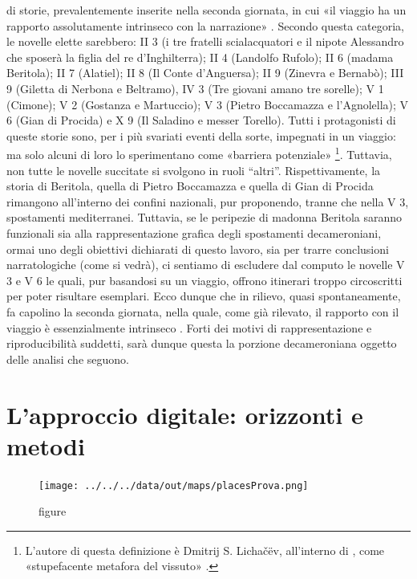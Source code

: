 di storie, prevalentemente inserite nella seconda giornata, in cui «il
viaggio ha un rapporto assolutamente intrinseco con la narrazione»
\autocite[p.~549]{asor1992}. Secondo questa categoria, le novelle elette
sarebbero: II 3 (i tre fratelli scialacquatori e il nipote Alessandro
che sposerà la figlia del re d'Inghilterra); II 4 (Landolfo Rufolo); II
6 (madama Beritola); II 7 (Alatiel); II 8 (Il Conte d'Anguersa); II 9
(Zinevra e Bernabò); III 9 (Giletta di Nerbona e Beltramo), IV 3 (Tre
giovani amano tre sorelle); V 1 (Cimone); V 2 (Gostanza e Martuccio); V
3 (Pietro Boccamazza e l'Agnolella); V 6 (Gian di Procida) e X 9 (Il
Saladino e messer Torello). Tutti i protagonisti di queste storie sono,
per i più svariati eventi della sorte, impegnati in un viaggio: ma solo
alcuni di loro lo sperimentano come «barriera potenziale» \footnote{L'autore
  di questa definizione è Dmitrij S. Lichačëv, all'interno di
  \autocite[pp.~26-39]{lotman1973}, come «stupefacente metafora del
  vissuto» \autocite[p.~550]{asor1992}.}. Tuttavia, non tutte le novelle
succitate si svolgono in ruoli ``altri''. Rispettivamente, la storia di
Beritola, quella di Pietro Boccamazza e quella di Gian di Procida
rimangono all'interno dei confini nazionali, pur proponendo, tranne che
nella V 3, spostamenti mediterranei. Tuttavia, se le peripezie di
madonna Beritola saranno funzionali sia alla rappresentazione grafica
degli spostamenti decameroniani, ormai uno degli obiettivi dichiarati di
questo lavoro, sia per trarre conclusioni narratologiche (come si
vedrà), ci sentiamo di escludere dal computo le novelle V 3 e V 6 le
quali, pur basandosi su un viaggio, offrono itinerari troppo
circoscritti per poter risultare esemplari. Ecco dunque che in rilievo,
quasi spontaneamente, fa capolino la seconda giornata, nella quale, come
già rilevato, il rapporto con il viaggio è essenzialmente intrinseco
\autocite{zatti2004}. Forti dei motivi di rappresentazione e
riproducibilità suddetti, sarà dunque questa la porzione decameroniana
oggetto delle analisi che seguono.

\section{L'approccio digitale: orizzonti e
metodi}\label{lapproccio-digitale-orizzonti-e-metodi}

\begin{figure}
\centering
\texttt{[image: ../../../data/out/maps/placesProva.png]}
\caption{figure}
\end{figure}

